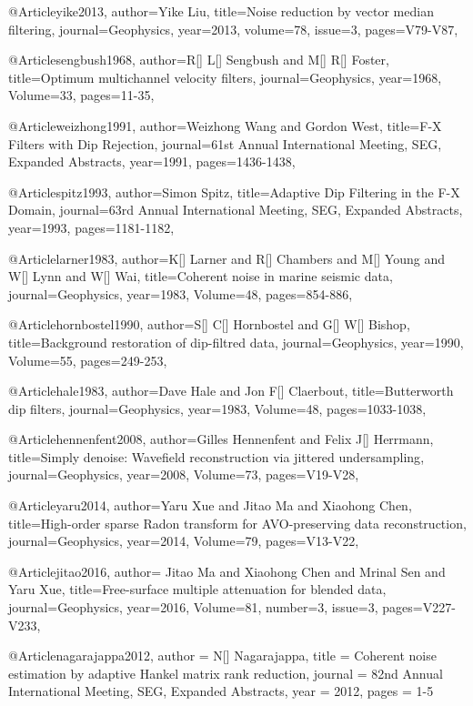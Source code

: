 {@Article{yike2013,
  author={Yike Liu},
  title={Noise reduction by vector median filtering},
  journal={Geophysics},
  year=2013,
  volume=78,
  issue=3,
  pages={V79-V87},
}



@Article{sengbush1968,
  author={R[] L[] Sengbush and M[] R[] Foster},
  title={Optimum multichannel velocity filters},
  journal={Geophysics},
  year=1968,
  Volume=33,
  pages={11-35},
}

@Article{weizhong1991,
  author={Weizhong Wang and Gordon West},
  title={F-X Filters with Dip Rejection},
  journal={61st Annual International Meeting, SEG, Expanded Abstracts},
  year=1991,
  pages={1436-1438},
}

@Article{spitz1993,
  author={Simon Spitz},
  title={Adaptive Dip Filtering in the F-X Domain},
  journal={63rd Annual International Meeting, SEG, Expanded Abstracts},
  year=1993,
  pages={1181-1182},
}


@Article{larner1983,
  author={K[] Larner and R[] Chambers and M[] Young and W[] Lynn and W[] Wai},
  title={Coherent noise in marine seismic data},
  journal={Geophysics},
  year=1983,
  Volume=48,
  pages={854-886},
}

@Article{hornbostel1990,
  author={S[] C[] Hornbostel and G[] W[] Bishop},
  title={Background restoration of dip-filtred data},
  journal={Geophysics},
  year=1990,
  Volume=55,
  pages={249-253},
}

@Article{hale1983,
  author={Dave Hale and Jon F[] Claerbout},
  title={Butterworth dip filters},
  journal={Geophysics},
  year=1983,
  Volume=48,
  pages={1033-1038},
}

@Article{hennenfent2008,
  author={Gilles Hennenfent and Felix J[] Herrmann},
  title={Simply denoise: Wavefield reconstruction via jittered undersampling},
  journal={Geophysics},
  year=2008,
  Volume=73,
  pages={V19-V28},
}

@Article{yaru2014,
  author={Yaru Xue and Jitao Ma and Xiaohong Chen},
  title={High-order sparse Radon transform for AVO-preserving data reconstruction},
  journal={Geophysics},
  year=2014,
  Volume=79,
  pages={V13-V22},
}

@Article{jitao2016,
  author={ Jitao Ma and Xiaohong Chen and Mrinal Sen and Yaru Xue},
  title={Free-surface multiple attenuation for blended data},
  journal={Geophysics},
  year=2016,
  Volume=81,
  number=3,
  issue=3,
  pages={V227-V233},
}

@Article{nagarajappa2012,
  author = 	 {N[] Nagarajappa},
  title = 	 {Coherent noise estimation by adaptive Hankel matrix rank reduction},
  journal = 	 {82nd Annual International Meeting, SEG, Expanded Abstracts},
  year = 	 2012,
  pages =	 {1-5}
}

}
